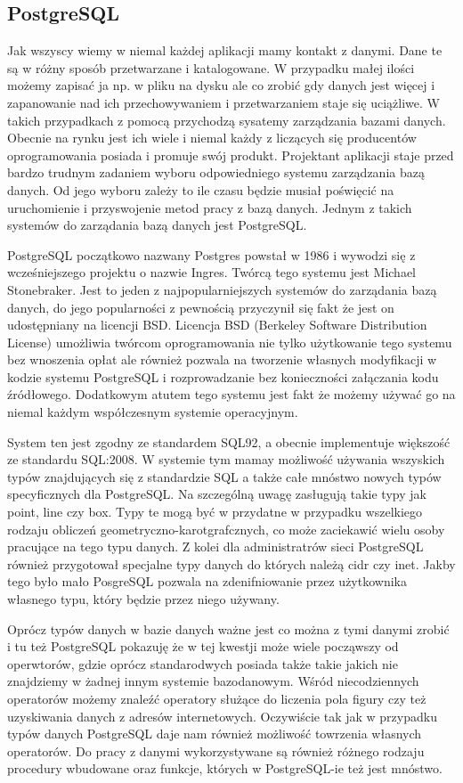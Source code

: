 \subsection{PostgreSQL}
Jak wszyscy wiemy w niemal każdej aplikacji mamy kontakt z danymi. Dane te są w różny sposób przetwarzane i 
katalogowane. W przypadku małej ilości możemy zapisać ja np. w pliku na dysku ale co zrobić gdy danych jest 
więcej i zapanowanie nad ich przechowywaniem i przetwarzaniem staje się uciążliwe. W takich przypadkach
z pomocą przychodzą sysatemy zarządzania bazami danych. Obecnie na rynku jest ich wiele i niemal każdy z liczących
się producentów oprogramowania posiada i promuje swój produkt. Projektant aplikacji staje przed bardzo trudnym 
zadaniem wyboru odpowiedniego systemu zarządzania bazą danych. Od jego wyboru zależy to ile czasu będzie musiał
poświęcić na uruchomienie i przyswojenie metod pracy z bazą danych. Jednym z takich systemów do zarządania bazą
danych jest PostgreSQL.

PostgreSQL początkowo nazwany Postgres powstał w 1986 i wywodzi się z wcześniejszego projektu o nazwie Ingres.
Twórcą tego systemu jest Michael Stonebraker. Jest to jeden z najpopularniejszych systemów do zarządania 
bazą danych, do jego popularności z pewnością przyczynił się fakt że jest on udostępniany na licencji BSD.
Licencja BSD (Berkeley Software Distribution License) umożliwia twórcom oprogramowania nie tylko użytkowanie 
tego systemu bez wnoszenia opłat ale również pozwala na tworzenie własnych modyfikacji w kodzie systemu 
PostgreSQL i rozprowadzanie bez konieczności załączania kodu źródłowego. Dodatkowym atutem tego systemu jest
fakt że możemy używać go na niemal każdym współczesnym systemie operacyjnym. 

System ten jest zgodny ze standardem SQL92, a obecnie implementuje większość ze standardu SQL:2008.
W systemie tym mamay możliwość używania wszyskich typów znajdujących się z standardzie SQL a także 
całe mnóstwo nowych typów specyficznych dla PostgreSQL. Na szczególną uwagę zasługują takie typy jak point, line 
czy box. Typy te mogą być w przydatne w przypadku wszelkiego rodzaju obliczeń geometryczno-karotgrafcznych,
co może zaciekawić wielu osoby pracujące na tego typu danych. Z kolei dla administratrów sieci PostgreSQL
również przygotował specjalne typy danych do których należą cidr czy inet. Jakby tego było mało PosgreSQL
pozwala na zdenifniowanie przez użytkownika własnego typu, który będzie przez niego używany.

Oprócz typów danych w bazie danych ważne jest co można z tymi danymi zrobić i tu też PostgreSQL pokazuję
że w tej kwestji może wiele począwszy od operwtorów, gdzie oprócz standarodwych posiada także takie jakich 
nie znajdziemy w żadnej innym systemie bazodanowym. Wśród niecodziennych operatorów możemy znaleźć
operatory służące do liczenia pola figury czy też uzyskiwania danych z adresów internetowych. Oczywiście tak
jak w przypadku typów danych PostgreSQL daje nam również możliwość towrzenia własnych operatorów. 
Do pracy z danymi wykorzystywane są również różnego rodzaju procedury wbudowane oraz funkcje, których w 
PostgreSQL-ie też jest mnóstwo. 


